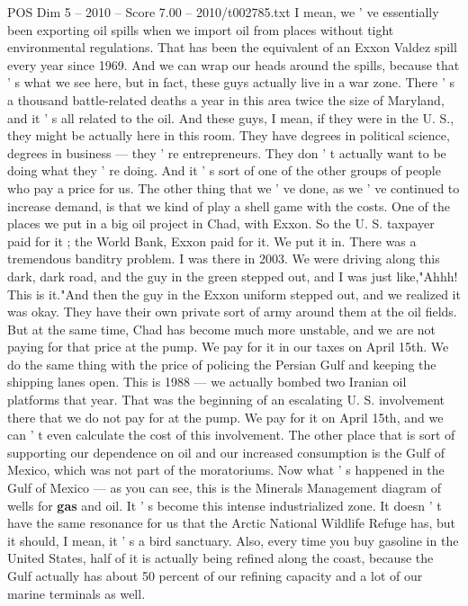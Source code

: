 \begin{textsample}{POS Dim 5 – 2010 – Score 7.00 – 2010/t002785.txt}
I mean, we ' ve essentially been exporting oil spills when we import oil from places without tight environmental regulations.
That has been the equivalent of an Exxon Valdez spill every year since 1969.
And we can wrap our heads around the spills, because that ' s what we see here, but in fact, these guys actually live in a war zone.
There ' s a thousand battle-related deaths a year in this area twice the size of Maryland, and it ' s all related to the oil.
And these guys, I mean, if they were in the U.
S., they might be actually here in this room.
They have degrees in political science, degrees in business — they ' re entrepreneurs.
They don ' t actually want to be doing what they ' re doing.
And it ' s sort of one of the other groups of people who pay a price for us.
The other thing that we ' ve done, as we ' ve continued to increase demand, is that we kind of play a shell game with the costs.
One of the places we put in a big oil project in Chad, with Exxon.
So the U.
S. taxpayer paid for it ; the World Bank, Exxon paid for it.
We put it in.
There was a tremendous banditry problem.
I was there in 2003.
We were driving along this dark, dark road, and the guy in the green stepped out, and I was just like,"Ahhh!
This is it."And then the guy in the Exxon uniform stepped out, and we realized it was okay.
They have their own private sort of army around them at the oil fields.
But at the same time, Chad has become much more unstable, and we are not paying for that price at the pump.
We pay for it in our taxes on April 15th.
We do the same thing with the price of policing the Persian Gulf and keeping the shipping lanes open.
This is 1988 — we actually bombed two Iranian oil platforms that year.
That was the beginning of an escalating U.
S. involvement there that we do not pay for at the pump.
We pay for it on April 15th, and we can ' t even calculate the cost of this involvement.
The other place that is sort of supporting our dependence on oil and our increased consumption is the Gulf of Mexico, which was not part of the moratoriums.
Now what ' s happened in the Gulf of Mexico — as you can see, this is the Minerals Management diagram of wells for \textbf{gas} and oil.
It ' s become this intense industrialized zone.
It doesn ' t have the same resonance for us that the Arctic National Wildlife Refuge has, but it should, I mean, it ' s a bird sanctuary.
Also, every time you buy gasoline in the United States, half of it is actually being refined along the coast, because the Gulf actually has about 50 percent of our refining capacity and a lot of our marine terminals as well.

\end{textsample}
